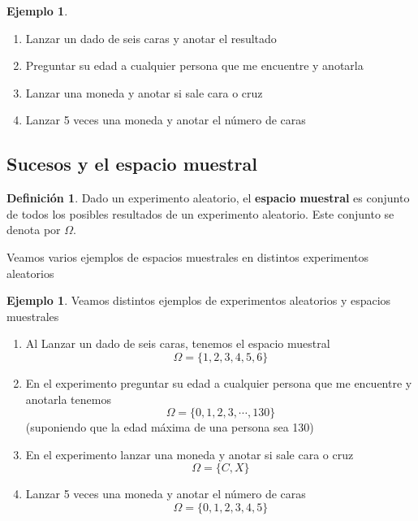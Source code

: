 \documentclass[]{book}
\theoremstyle{plain}
\theoremstyle{definition}
\newtheorem{definition}[theorem]{Definición}
\newtheorem{example}[theorem]{Ejemplo}
\begin{document}
\begin{example}
\begin{enumerate}
    \item Lanzar un dado de seis caras y anotar el resultado
    \item Preguntar su edad a cualquier persona que me encuentre y anotarla
    \item Lanzar una moneda y anotar si sale cara o cruz
    \item Lanzar 5 veces una moneda y anotar el número de caras
\end{enumerate}
\end{example}


\subsection*{Sucesos y el espacio muestral}

\begin{definition}
   Dado un experimento aleatorio, el \textbf{espacio muestral}  es 
   conjunto de todos los posibles resultados de un experimento aleatorio. Este conjunto se denota 
   por $\Omega$.
\end{definition}
Veamos varios ejemplos de espacios muestrales en distintos experimentos aleatorios
\begin{example}
  Veamos distintos ejemplos de experimentos aleatorios y espacios muestrales
        \begin{enumerate}
            \item Al Lanzar un dado de seis caras, tenemos el espacio muestral 
            \[\Omega = \{1, 2, 3, 4, 5, 6\}\]
            \item En el experimento preguntar su edad a cualquier persona que me encuentre y anotarla tenemos
            \[\Omega = \{0,1, 2, 3,\cdots, 130\}\]
            (suponiendo que la edad máxima de una persona sea 130)
            \item En el experimento lanzar una moneda y anotar si sale cara o cruz
            \[\Omega = \{C, X\}\]
            \item Lanzar 5 veces una moneda y anotar el número de caras
            \[\Omega = \{0, 1, 2, 3, 4, 5\}\]
        \end{enumerate}
\end{example}
\end{document}
